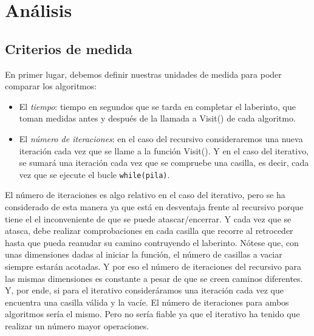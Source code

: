 \documentclass[12pt,a4paper]{article}
\begin{document}
\clearpage
\section{Análisis}
\subsection{Criterios de medida}
En primer lugar, debemos definir nuestras unidades de medida para poder comparar los algoritmos:
\begin{itemize}
	\item El \textit{tiempo}: tiempo en segundos que se tarda en completar el laberinto, que toman medidas antes y después de la llamada a \textsf{Visit()} de cada algoritmo.
	\item El \textit{número de iteraciones}: en el caso del recursivo consideraremos una nueva iteración cada vez que se llame a la función \textsf{Visit()}. Y en el caso del iterativo, se sumará una iteración cada vez que se compruebe una casilla, es decir, cada vez que se ejecute el bucle \verb|while(pila)|. 

\end{itemize}

El número de iteraciones es algo relativo en el caso del iterativo, pero se ha considerado de esta manera ya que está en desventaja frente al recursivo porque tiene el el inconveniente de que se puede atascar/encerrar. Y cada vez que se atasca, debe realizar comprobaciones en cada casilla que recorre al retroceder hasta que pueda reanudar su camino contruyendo el laberinto. Nótese que, con unas dimensiones dadas al iniciar la función, el número de casillas a vaciar siempre estarán acotadas. Y por eso el número de iteraciones del recursivo para las mismas dimensiones es constante a pesar de que se creen caminos diferentes. Y, por ende, si para el iterativo consideráramos una iteración cada vez que encuentra una casilla válida y la vacíe. El número de iteraciones para ambos algoritmos sería el mismo. Pero no sería fiable ya que el iterativo ha tenido que realizar un número mayor operaciones.

\vspace{0.2cm}
\end{document}

